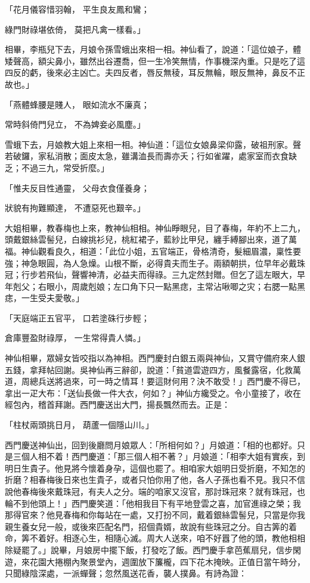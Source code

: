 「花月儀容惜羽翰，  平生良友鳳和鸞；

綠門財祿堪依倚，  莫把凡禽一樣看。」

相畢，李瓶兒下去，月娘令孫雪蛾出來相一相。神仙看了，說道：「這位娘子，體矮聲高，額尖鼻小，雖然出谷遷喬，但一生冷笑無情，作事機深內重。只是吃了這四反的虧，後來必主凶亡。夫四反者，唇反無稜，耳反無輪，眼反無神，鼻反不正故也。」

「燕體蜂腰是賤人，  眼如流水不廉真；

常時斜倚門兒立，  不為婢妾必風塵。」

雪蛾下去，月娘教大姐上來相一相。神仙道：「這位女娘鼻梁仰露，破祖刑家。聲若破鑼，家私消散；面皮太急，雖溝洫長而壽亦夭；行如雀躍，處家室而衣食缺乏；不過三九，常受折麼。」

「惟夫反目性通靈，  父母衣食僅養身；

狀貌有拘難顯達，  不遭惡死也艱辛。」

大姐相畢，教春梅也上來，教神仙相相。神仙睜眼兒，目了春梅，年約不上二九，頭戴銀絲雲髻兒，白線挑衫兒，桃紅裙子，藍紗比甲兒，纏手縛腳出來，道了萬福。神仙觀看良久，相道：「此位小姐，五官端正，骨格清奇，髮細眉濃，稟性要強；神急眼圓，為人急燥。山根不斷，必得貴夫而生子。兩額朝拱，位早年必戴珠冠；行步若飛仙，聲響神清，必益夫而得祿。三九定然封贈。但乞了這左眼大，早年剋父；右眼小，周歲剋娘；左口角下只一點黑痣，主常沾啾唧之灾；右腮一點黑痣，一生受夫愛敬。」

「天庭端正五官平，  口若塗硃行步輕；

倉庫豐盈財祿厚，  一生常得貴人憐。」

神仙相畢，眾婦女皆咬指以為神相。西門慶封白銀五兩與神仙，又賞守備府來人銀五錢，拿拜帖回謝。吳神仙再三辭卻，說道：「貧道雲遊四方，風餐露宿，化救萬道，周總兵送將過來，可一時之情耳！要這財何用？決不敢受！」西門慶不得已，拿出一疋大布：「送仙長做一件大衣，何如？」神仙方纔受之。令小童接了，收在經包內，稽首拜謝。西門慶送出大門，揚長飄然而去。正是：

「柱杖兩頭挑日月，  葫蘆一個隱山川。」

西門慶送神仙出，回到後廳問月娘眾人：「所相何如？」月娘道：「相的也都好。只是三個人相不着！西門慶道：「那三個人相不著？」月娘道：「相李大姐有實疾，到明日生貴子。他見將今懷着身孕，這個也罷了。相咱家大姐明日受折磨，不知怎的折磨？相春梅後日來也生貴子，或者只怕你用了他，各人子孫也看不見。我只不信說他春梅後來戴珠冠，有夫人之分。端的咱家又沒官，那討珠冠來？就有珠冠，也輪不到他頭上！」西門慶笑道：「他相我目下有平地登雲之喜，加官進祿之榮；我那得官來？他見春梅和你每站在一處，又打扮不同，戴着銀絲雲髻兒，只當是你我親生養女兒一般，或後來匹配名門，招個貴婿，故說有些珠冠之分。自古筭的着命，筭不着好。相逐心生，相隨心滅。周大人送來，咱不好囂了他的頭，教他相相除疑罷了。」說畢，月娘房中擺下飯，打發吃了飯。西門慶手拿芭蕉扇兒，信步閑遊，來花園大捲棚內聚景堂內，週圍放下簾櫳，四下花木掩映。正值日當午時分，只聞綠陰深處，一派蟬聲；忽然風送花香，襲人撲鼻。有詩為證：

